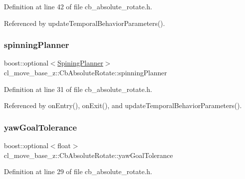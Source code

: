 Definition at line 42 of file cb\+\_\+absolute\+\_\+rotate.\+h.



Referenced by update\+Temporal\+Behavior\+Parameters().

\mbox{\label{classcl__move__base__z_1_1CbAbsoluteRotate_a17d836524599af072cf2e3488e491a91}} 
\subsubsection{\texorpdfstring{spinning\+Planner}{spinningPlanner}}
{\footnotesize\ttfamily boost\+::optional$<$\hyperlink{namespacecl__move__base__z_aab2ad3041275145f0065fb60b3299345}{Spining\+Planner}$>$ cl\+\_\+move\+\_\+base\+\_\+z\+::\+Cb\+Absolute\+Rotate\+::spinning\+Planner}



Definition at line 31 of file cb\+\_\+absolute\+\_\+rotate.\+h.



Referenced by on\+Entry(), on\+Exit(), and update\+Temporal\+Behavior\+Parameters().

\mbox{\label{classcl__move__base__z_1_1CbAbsoluteRotate_a8d8b5b9c2c821efe101bb07c96c4bdd3}} 
\subsubsection{\texorpdfstring{yaw\+Goal\+Tolerance}{yawGoalTolerance}}
{\footnotesize\ttfamily boost\+::optional$<$float$>$ cl\+\_\+move\+\_\+base\+\_\+z\+::\+Cb\+Absolute\+Rotate\+::yaw\+Goal\+Tolerance}



Definition at line 29 of file cb\+\_\+absolute\+\_\+rotate.\+h.



